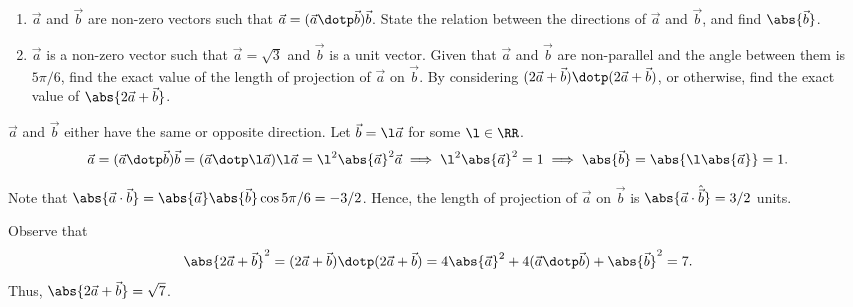 \clearpage
\begin{problem}
    \begin{enumerate}
        \item $\vec a$ and $\vec b$ are non-zero vectors such that $\vec a = (\vec a \dotp \vec b) \vec b$. State the relation between the directions of $\vec a$ and $\vec b$, and find $\abs{\vec b}$.
        \item $\vec a$ is a non-zero vector such that $\vec a = \sqrt3$ and $\vec b$ is a unit vector. Given that $\vec a$ and $\vec b$ are non-parallel and the angle between them is $5\pi/6$, find the exact value of the length of projection of $\vec a$ on $\vec b$. By considering $(2\vec a + \vec b)\dotp(2 \vec a + \vec b)$, or otherwise, find the exact value of $\abs{2\vec a + \vec b}$.
    \end{enumerate}
\end{problem}
\begin{solution}
    \begin{ppart}
        $\vec a$ and $\vec b$ either have the same or opposite direction. Let $\vec b = \l \vec a$ for some $\l \in \RR$. \[\vec a = (\vec a \dotp \vec b) \vec b = (\vec a \dotp \l \vec a) \l \vec a = \l^2 \abs{\vec a}^2 \vec a \implies \l^2\abs{\vec a}^2 = 1 \implies \abs{\vec b} = \abs{\l\abs{\vec a}} = 1.\]
    \end{ppart}
    \begin{ppart}
        Note that $\abs{\vec a \cdot \vec b} = \abs{\vec a}\abs{\vec b} \cos{5\pi/6} = -3/2$. Hence, the length of projection of $\vec a$ on $\vec b$ is $\abs{\vec a \cdot \hat{\vec b}} = 3/2$ units.

        Observe that \[\abs{2\vec a + \vec b}^2 = (2\vec a + \vec b)\dotp (2\vec a + \vec b) = 4 \abs{\vec a}^2 + 4 (\vec a \dotp \vec b) + \abs{\vec b}^2 = 7.\] Thus, $\abs{2\vec a + \vec b} = \sqrt{7}$.
    \end{ppart}
\end{solution}

